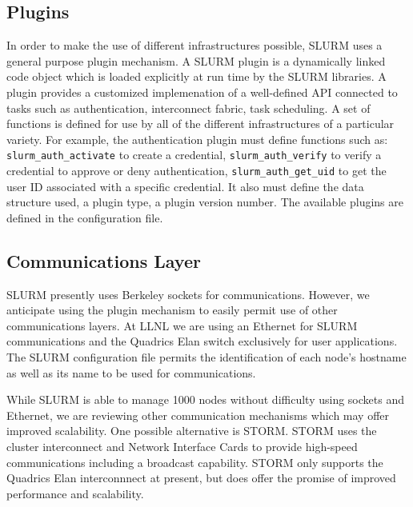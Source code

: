 \subsection{Plugins}

In order to make the use of different infrastructures possible, 
SLURM uses a general purpose plugin mechanism. 
A SLURM plugin is a dynamically linked code object which is 
loaded explicitly at run time by the SLURM libraries. 
A plugin provides a customized implemenation of a well-defined
API connected to tasks such as authentication, interconnect fabric, 
task scheduling.
A set of functions is defined for use by all of the different 
infrastructures of a particular variety. 
For example, the authentication plugin must define functions 
such as: 
{\tt slurm\_auth\_activate} to create a credential,
{\tt slurm\_auth\_verify} to verify a credential to 
approve or deny authentication, 
{\tt slurm\_auth\_get\_uid} to get the user ID associated with 
a specific credential.
It also must define the data structure used, a plugin type, 
a plugin version number.
The available plugins are defined in the configuration file.

\subsection{Communications Layer}

SLURM presently uses Berkeley sockets for communications. 
However, we anticipate using the plugin mechanism to easily 
permit use of other communications layers. 
At LLNL we are using an Ethernet for SLURM communications and 
the Quadrics Elan switch exclusively for user applications. 
The SLURM configuration file permits the identification of each 
node's hostname as well as its name to be used for communications. 

While SLURM is able to manage 1000 nodes without difficulty using 
sockets and Ethernet, we are reviewing other communication 
mechanisms which may offer improved scalability. 
One possible alternative is STORM\cite{STORM2001}. 
STORM uses the cluster interconnect and Network Interface Cards to 
provide high-speed communications including a broadcast capability. 
STORM only supports the Quadrics Elan interconnnect at present, 
but does offer the promise of improved performance and scalability. 


